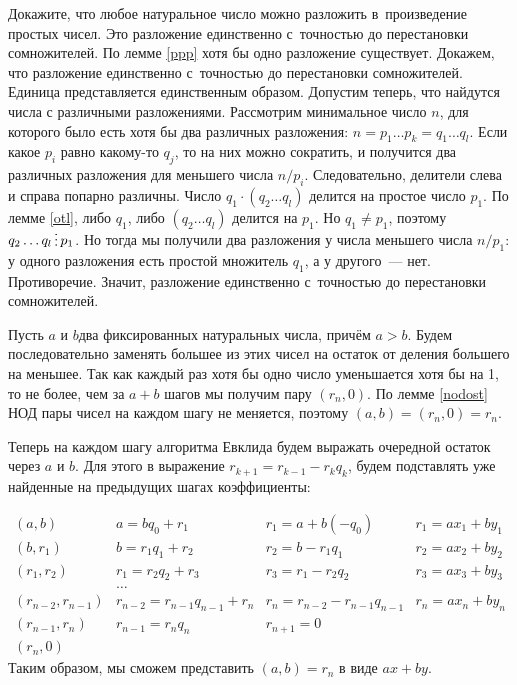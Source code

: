\documentclass[a4paper,12pt]{article}
\begin{document}
Докажите, что любое натуральное число можно разложить в~произведение простых чисел. Это разложение единственно с~точностью до перестановки сомножителей.
По лемме \ref{ppp} хотя бы одно разложение существует. Докажем, что разложение единственно с~точностью до перестановки сомножителей. Единица представляется единственным образом.
Допустим теперь, что найдутся числа с различными разложениями.
Рассмотрим минимальное число $n$, для которого было есть хотя бы два различных разложения: $n=p_1\ldots p_k=q_1\ldots q_l$.
Если какое $p_i$ равно какому-то $q_j$, то на них можно сократить, и получится два различных разложения для меньшего числа $n/p_i$.
Следовательно, делители слева и справа попарно различны.
Число $q_1 \cdot (q_2\ldots q_l)$ делится на простое число $p_1$. По лемме \ref{otl}, либо $q_1$, либо $(q_2\ldots q_l)$ делится на $p_1$. Но $q_1\ne p_1$, поэтому $q_2\ldots q_l\dv p_1$. Но тогда мы получили два разложения у числа меньшего числа $n/p_1$: у одного разложения есть простой множитель $q_1$, а у другого~--- нет.
Противоречие. Значит, разложение единственно с~точностью до перестановки сомножителей.



Пусть $a$ и $b$\т два фиксированных натуральных числа, причём $a>b$.
Будем последовательно заменять большее из этих чисел на остаток от деления большего на меньшее.
Так как каждый раз хотя бы одно число уменьшается хотя бы на 1, то не более, чем за $a+b$ шагов мы получим пару $(r_n,0)$.
По лемме \ref{nodost} НОД пары чисел на каждом шагу не меняется, поэтому $(a,b)=(r_n,0) = r_n$.

Теперь на каждом шагу алгоритма Евклида будем выражать очередной остаток через $a$ и $b$.
Для этого в выражение $r_{k+1} = r_{k-1} - r_kq_k$, будем подставлять уже найденные на предыдущих шагах коэффициенты:

$$
\begin{array}{llll}
  (a,b) & a=bq_0 + r_1 & r_1 = a+b(-q_0) & r_1 = ax_1 + by_1 \\
  (b,r_1) & b = r_1 q_1 + r_2 & r_2 = b - r_1q_1  & r_2 = ax_2 + by_2 \\
  (r_1,r_2) & r_1 = r_2 q_2 + r_3 & r_3 = r_1 - r_2q_2   & r_3 = ax_3 + by_3\\
  &\ldots\\
  (r_{n-2},r_{n-1}) & r_{n-2} = r_{n-1} q_{n-1} + r_{n} & r_{n} = r_{n-2} - r_{n-1}q_{n-1}  & r_n = ax_n + by_n\\
  (r_{n-1},r_n) & r_{n-1} = r_n q_n & r_{n+1} = 0 & \\
  (r_n, 0) 
\end{array}
$$
Таким образом, мы сможем представить $(a,b)=r_n$ в виде $ax + by$.
\end{document}
